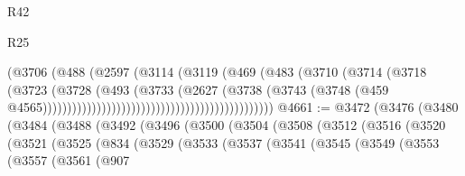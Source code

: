 \begin{lexlean}{R42}
\begin{lexlean}{R25}
\begin{coremodule}
{{{{{{{{{{{{{{{{{{{{{{{{{{{{{{{{{{{{{{{{{{{{{{{{{{{{{{{{{{{{{{{{{{{{{{{{{{{{{{{{{{{{{{{{{{{{{{{{{{{{{{{{{{{{{{{{{{{{{{{{{{{{{{{{{{{{{{{{{{{{{{{{{{{{{{{{{{{{{{{{{{{{{{{{{{{{{{{{{{{{{{{{{{{{{{{{{{{{{{{                                                            (@3706
                                                              (@488
                                                                (@2597
                                                                  (@3114
                                                                    (@3119
                                                                      (@469
                                                                        (@483
                                                                          (@3710
                                                                            (@3714
                                                                              (@3718
                                                                                (@3723
                                                                                  (@3728
                                                                                    (@493
                                                                                      (@3733
                                                                                        (@2627
                                                                                          (@3738
                                                                                            (@3743
                                                                                              (@3748
                                                                                                (@459
                                                                                                  @4565)))))))))))))))))))))))))))))))))))))))))))))))
@4661 := @3472
    (@3476
      (@3480
        (@3484
          (@3488
            (@3492
              (@3496
                (@3500
                  (@3504
                    (@3508
                      (@3512
                        (@3516
                          (@3520
                            (@3521
                              (@3525
                                (@834
                                  (@3529
                                    (@3533
                                      (@3537
                                        (@3541
                                          (@3545
                                            (@3549
                                              (@3553
                                                (@3557
                                                  (@3561
                                                    (@907
}}}}}}}}}}}}}}}}}}}}}}}}}}}}}}}}}}}}}}}}}}}}}}}}}}}}}}}}}}}}}}}}}}}}}}}}}}}}}}}}}}}}}}}}}}}}}}}}}}}}}}}}}}}}}}}}}}}}}}}}}}}}}}}}}}}}}}}}}}}}}}}}}}}}}}}}}}}}}}}}}}}}}}}}}}}}}}}}}}}}}}}}}}}}}}}}}}}}}}}
\end{coremodule}
\end{lexlean}
\end{lexlean}
